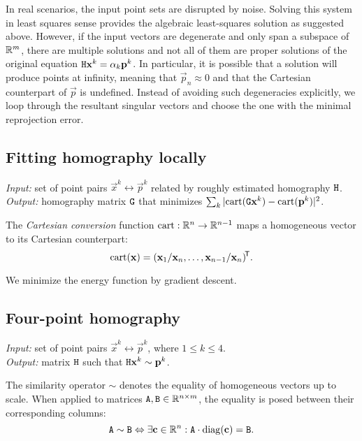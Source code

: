 In real scenarios, the input point sets are disrupted by noise.
Solving this system in least squares sense provides the algebraic least-squares solution as suggested above.
However, if the input vectors are degenerate and only span a subspace of $\mathbb{R}^m$, there are multiple solutions and not all of them are proper solutions of the original equation $\mathtt{H} \mathbf{x}^k = \alpha_k \mathbf{p}^k$.
In particular, it is possible that a solution will produce points at infinity, meaning that $\vec p_n \approx 0$ and that the Cartesian counterpart of $\vec p$ is undefined.
Instead of avoiding such degeneracies explicitly, we loop through the resultant singular vectors and choose the one with the minimal reprojection error.


\subsection{Fitting homography locally} 

\textit{Input:} set of point pairs $\vec x^k \leftrightarrow \vec p^k$ related by roughly estimated homography $\mathtt{H}$.\\
\textit{Output:} homography matrix $\mathtt{G}$ that minimizes $\sum_k |\mathrm{cart}(\mathtt{G} \mathbf{x}^k) - \mathrm{cart}(\mathbf{p}^k)|^2$.\\

\begin{definition}
The \textit{Cartesian conversion} function $\mathrm{cart}: \mathbb{R}^n \to \mathbb{R}^{n - 1}$ maps a homogeneous vector to its Cartesian counterpart:
$$
\mathrm{cart}(\mathbf{x}) = (\mathbf{x}_1 / \mathbf{x}_n, \dots, \mathbf{x}_{n - 1} / \mathbf{x}_n)^{\!\mathsf{T}}.
$$
\end{definition}

We minimize the energy function by gradient descent.

\subsection{Four-point homography}

\textit{Input:} set of point pairs $\vec x^k \leftrightarrow \vec p^k$, where $1 \leq k \leq 4$.\\
\textit{Output:} matrix $\mathtt{H}$ such that $\mathtt{H} \mathbf{x}^k \sim \mathbf{p}^k$.\\

\begin{definition}
The similarity operator $\sim$ denotes the equality of homogeneous vectors up to scale.
When applied to matrices $\mathtt{A}, \mathtt{B} \in \mathbb{R}^{n \times m}$, the equality is posed between their corresponding columns:
$$
\mathtt{A} \sim \mathtt{B} \Leftrightarrow \exists \mathbf{c} \in \mathbb{R}^n : \mathtt{A} \cdot \mathrm{diag}(\mathbf{c}) = \mathtt{B}.
$$
\end{definition}

